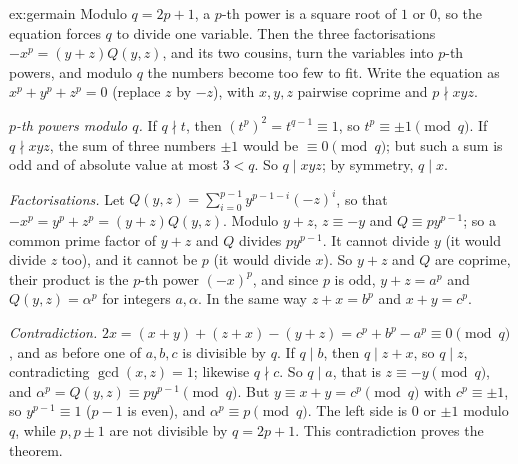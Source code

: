 \begin{solution}{ex:germain}
\idea Modulo $q=2p+1$, a $p$-th power is a square root of $1$ or $0$, so the equation forces $q$ to divide one variable. Then
the three factorisations $-x^p=(y+z)Q(y,z)$, and its two cousins, turn the variables into $p$-th powers, and modulo $q$ the
numbers become too few to fit.
\writeup Write the equation as $x^p+y^p+z^p=0$ (replace $z$ by $-z$), with $x,y,z$ pairwise coprime and $p\nmid xyz$.

\emph{$p$-th powers modulo $q$.} If $q\nmid t$, then $(t^p)^2=t^{q-1}\equiv1$, so $t^p\equiv\pm1\pmod q$. If $q\nmid xyz$, the
sum of three numbers $\pm1$ would be $\equiv0\pmod q$; but such a sum is odd and of absolute value at most $3<q$. So $q\mid
xyz$; by symmetry, $q\mid x$.

\emph{Factorisations.} Let $Q(y,z)=\sum_{i=0}^{p-1}y^{p-1-i}(-z)^i$, so that $-x^p=y^p+z^p=(y+z)Q(y,z)$. Modulo $y+z$, $z\equiv-y$
and $Q\equiv py^{p-1}$; so a common prime factor of $y+z$ and $Q$ divides $py^{p-1}$. It cannot divide $y$ (it would divide $z$
too), and it cannot be $p$ (it would divide $x$). So $y+z$ and $Q$ are coprime, their product is the $p$-th power $(-x)^p$, and
since $p$ is odd, $y+z=a^p$ and $Q(y,z)=\alpha^p$ for integers $a,\alpha$. In the same way $z+x=b^p$ and $x+y=c^p$.

\emph{Contradiction.} $2x=(x+y)+(z+x)-(y+z)=c^p+b^p-a^p\equiv0\pmod q$, and as before one of $a,b,c$ is divisible by $q$. If $q
\mid b$, then $q\mid z+x$, so $q\mid z$, contradicting $\gcd(x,z)=1$; likewise $q\nmid c$. So $q\mid a$, that is $z\equiv-y
\pmod q$, and $\alpha^p=Q(y,z)\equiv py^{p-1}\pmod q$. But $y\equiv x+y=c^p\pmod q$ with $c^p\equiv\pm1$, so $y^{p-1}\equiv1$ ($p-1$
is even), and $\alpha^p\equiv p\pmod q$. The left side is $0$ or $\pm1$ modulo $q$, while $p,p\pm1$ are not divisible by
$q=2p+1$. This contradiction proves the theorem.
\end{solution}

